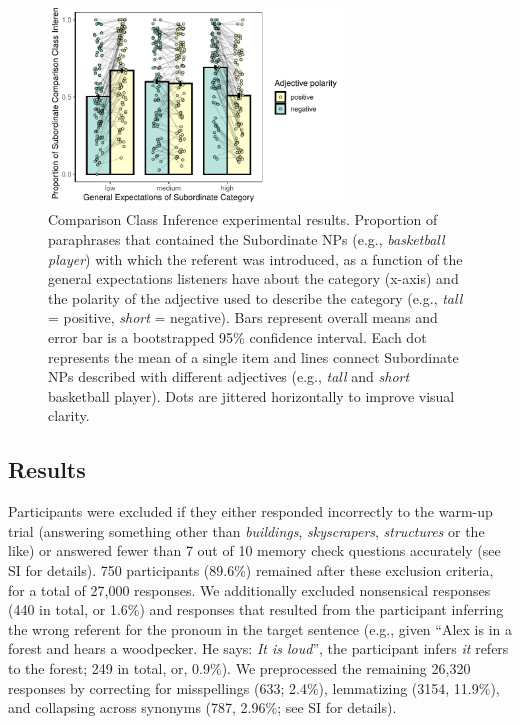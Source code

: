 \documentclass[doc]{apa6}
\begin{document}
\begin{figure}[t!]
\centering
\includegraphics[width=0.7\textwidth]{figs/bars_cc_finalExpt_prereg_bars_syncDodge.pdf}
\caption{Comparison Class Inference experimental results. Proportion of paraphrases that contained the Subordinate NPs (e.g., \emph{basketball player}) with which the referent was introduced, as a function of the general expectations listeners have about the category (x-axis) and the polarity of the adjective used to describe the category (e.g., \emph{tall} = positive, \emph{short} = negative). Bars represent overall means and error bar is a bootstrapped 95\% confidence interval. Each dot represents the mean of a single item and lines connect Subordinate NPs described with different adjectives (e.g., \emph{tall} and \emph{short} basketball player). Dots are jittered horizontally to improve visual clarity.}\label{fig:ccInferenceMain}
\end{figure}

\subsection{Results}

Participants were excluded if they either responded incorrectly to the warm-up trial (answering something other than \emph{buildings}, \emph{skyscrapers}, \emph{structures} or the like) or answered fewer than 7 out of 10 memory check questions accurately (see SI for details).
750 participants (89.6\%) remained after these exclusion criteria, for a total of 27,000 responses.
We additionally excluded nonsensical responses (440 in total, or 1.6\%)  and responses that resulted from the participant inferring the wrong referent for the pronoun in the target sentence (e.g., given ``Alex is in a forest and hears a woodpecker. He says: \emph{It is loud}'', the participant infers \emph{it} refers to the forest; 249 in total, or, 0.9\%).
We preprocessed the remaining 26,320 responses by correcting for misspellings  (633; 2.4\%), lemmatizing (3154, 11.9\%), and collapsing across synonyms (787, 2.96\%; see SI for details).
\end{document}
